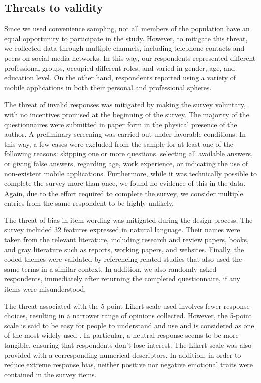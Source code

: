 \documentclass[preprint,12pt]{elsarticle}
\begin{document}
\subsection{Threats to validity}
Since we used convenience sampling, not all members of the population have an equal opportunity to participate in the study. However, to mitigate this threat, we collected data through multiple channels, including telephone contacts and peers on social media networks. In this way, our respondents represented different professional groups, occupied different roles, and varied in gender, age, and education level. 
On the other hand, respondents reported using a variety of mobile applications in both their personal and professional spheres. 

The threat of invalid responses was mitigated by making the survey voluntary, with no incentives promised at the beginning of the survey. The majority of the questionnaires were submitted in paper form in the physical presence of the author. A preliminary screening was carried out under favorable conditions. In this way, a few cases were excluded from the sample for at least one of the following reasons: skipping one or more questions, selecting all available answers, or giving false answers, regarding age, work experience, or indicating the use of non-existent mobile applications. Furthermore, while it was technically possible to complete the survey more than once, we found no evidence of this in the data. Again, due to the effort required to complete the survey, we consider multiple entries from the same respondent to be highly unlikely.

The threat of bias in item wording was mitigated during the design process. The survey included 32 features expressed in natural language. Their names were taken from the relevant literature, including research and review papers, books, and gray literature such as reports, working papers, and websites. Finally, the coded themes were validated by referencing related studies that also used the same terms in a similar context. In addition, we also randomly asked respondents, immediately after returning the completed questionnaire, if any items were misunderstood.

The threat associated with the 5-point Likert scale used involves fewer response choices, resulting in a narrower range of opinions collected. However, the 5-point scale is said to be easy for people to understand and use \cite{arkorful2022voter} and is considered as one of the most widely used \cite{ginters2023pragmatic}.
In particular, a neutral response seems to be more tangible, ensuring that respondents don't lose interest. The Likert scale was also provided with a corresponding numerical descriptors. In addition, in order to reduce extreme response bias, neither positive nor negative emotional traits were contained in the survey items.
\end{document}
